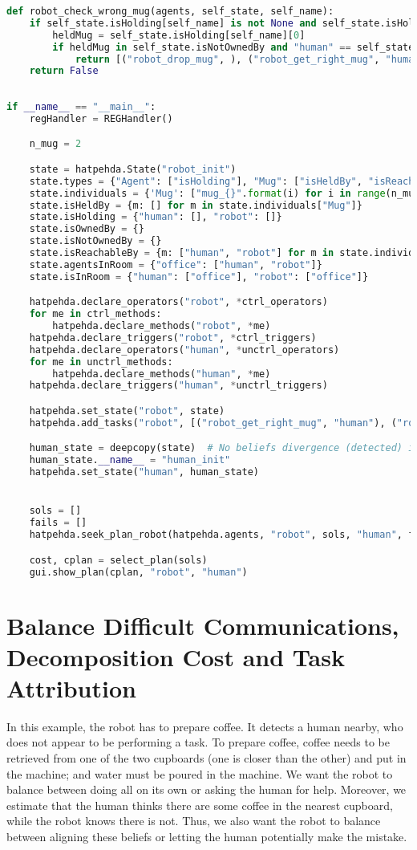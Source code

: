 \begin{lstlisting}[language=Python]
def robot_check_wrong_mug(agents, self_state, self_name):
    if self_state.isHolding[self_name] is not None and self_state.isHolding[self_name] != []:
        heldMug = self_state.isHolding[self_name][0]
        if heldMug in self_state.isNotOwnedBy and "human" == self_state.isNotOwnedBy[heldMug]:
            return [("robot_drop_mug", ), ("robot_get_right_mug", "human")]
    return False
    
    
if __name__ == "__main__":
    regHandler = REGHandler()

    n_mug = 2

    state = hatpehda.State("robot_init")
    state.types = {"Agent": ["isHolding"], "Mug": ["isHeldBy", "isReachableBy"]}
    state.individuals = {'Mug': ["mug_{}".format(i) for i in range(n_mug)]}
    state.isHeldBy = {m: [] for m in state.individuals["Mug"]}
    state.isHolding = {"human": [], "robot": []}
    state.isOwnedBy = {}
    state.isNotOwnedBy = {}
    state.isReachableBy = {m: ["human", "robot"] for m in state.individuals["Mug"]}
    state.agentsInRoom = {"office": ["human", "robot"]}
    state.isInRoom = {"human": ["office"], "robot": ["office"]}

    hatpehda.declare_operators("robot", *ctrl_operators)
    for me in ctrl_methods:
        hatpehda.declare_methods("robot", *me)
    hatpehda.declare_triggers("robot", *ctrl_triggers)
    hatpehda.declare_operators("human", *unctrl_operators)
    for me in unctrl_methods:
        hatpehda.declare_methods("human", *me)
    hatpehda.declare_triggers("human", *unctrl_triggers)

    hatpehda.set_state("robot", state)
    hatpehda.add_tasks("robot", [("robot_get_right_mug", "human"), ("robot_go_to_coffee_machine", )])  # Agenda initialization

    human_state = deepcopy(state)  # No beliefs divergence (detected) in this example
    human_state.__name__ = "human_init"
    hatpehda.set_state("human", human_state)


    sols = []
    fails = []
    hatpehda.seek_plan_robot(hatpehda.agents, "robot", sols, "human", fails)

    cost, cplan = select_plan(sols)
    gui.show_plan(cplan, "robot", "human")
\end{lstlisting}

\section{Balance Difficult Communications, Decomposition Cost and Task Attribution}
\label{annex:domaincoffee}
In this example, the robot has to prepare coffee. It detects a human nearby, who does not appear to be performing a task. To prepare coffee, coffee needs to be retrieved from one of the two cupboards (one is closer than the other) and put in the machine; and water must be poured in the machine. We want the robot to balance between doing all on its own or asking the human for help. Moreover, we estimate that the human thinks there are some coffee in the nearest cupboard, while the robot knows there is not. Thus, we also want the robot to balance between aligning these beliefs or letting the human potentially make the mistake.

